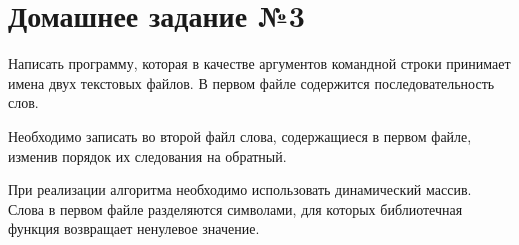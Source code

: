 \section*{Домашнее задание №3}


Написать программу, которая в качестве аргументов командной строки
принимает имена двух текстовых файлов. В первом файле содержится
последовательность слов.

Необходимо записать во второй файл слова,
содержащиеся в первом файле, изменив порядок их следования на
обратный.

При реализации алгоритма необходимо использовать
динамический массив. Слова в первом файле разделяются символами, для
которых библиотечная функция  возвращает ненулевое значение.
